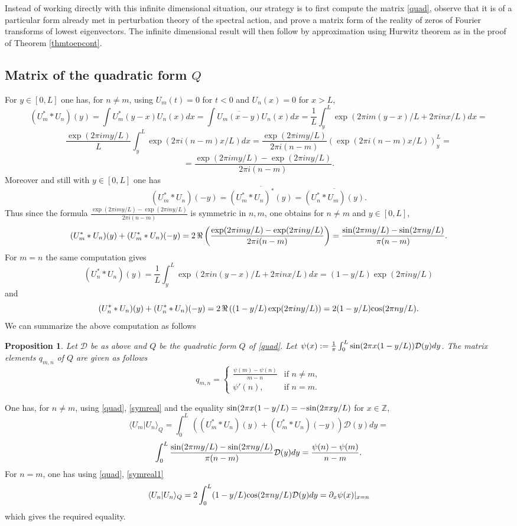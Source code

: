 \documentclass{amsart}
\newtheorem{prop}[thm]{Proposition}
\def\Z{{\mathbb Z}}
\def\cD{{\mathcal D}}
\def\sin{{{\rm sin}}}
\def\cos{{{\rm cos}}}
\def\Z{{\mathbb Z}}
\def\cD{{\mathcal D}}
\def\sin{{{\rm sin}}}
\def\cos{{{\rm cos}}}
\begin{document}
Instead of working directly with this infinite dimensional situation, our strategy is to   first compute the matrix \eqref{quad}, observe that it is of a particular form already met in perturbation theory of the spectral action, and prove a matrix form of the reality of zeros of Fourier transforms of lowest eigenvectors. The infinite dimensional result will then follow by approximation using Hurwitz theorem as in the proof of Theorem \ref{thmtoepcont}.
\subsection{Matrix of the quadratic form $Q$}
For $y\in [0,L]$ one has, for $n\neq m$, using $U_m(t)=0$ for $t<0$ and $U_n(x)=0$ for $x>L$,
$$
(U_m^**U_n)(y)=\int U_m^*(y-x)U_n(x)dx=\int \overline{ U_m(x-y)}U_n(x)dx=\frac 1L\int_y^L\exp(2\pi im(y-x)/L+2\pi inx/L)dx=
$$
$$
\frac{\exp(2\pi im y/L)}{L}\int_y^L\exp(2\pi i(n-m)x/L)dx=\frac{\exp(2\pi im y/L)}{2\pi i(n-m)}\left(\exp(2\pi i(n-m)x/L)\right)_y^L=$$ $$=\frac{\exp(2\pi im y/L)-\exp(2\pi in y/L)}{2\pi i(n-m)}.
$$
Moreover and still with $y\in [0,L]$ one has
$$
(U_m^**U_n)(-y)=\overline{(U_m^**U_n)^*(y)}=\overline{(U_n^**U_m)(y)}.
$$
Thus since the formula $\frac{\exp(2\pi im y/L)-\exp(2\pi in y/L)}{2\pi i(n-m)}$ is symmetric in $n,m$, one obtains for $n\neq m$ and $y\in [0,L]$,
\begin{equation}\label{symreal}
(U_m^**U_n)(y)+(U_m^**U_n)(-y)=2\,\Re\left(\frac{\exp(2\pi im y/L)-\exp(2\pi in y/L)}{2\pi i(n-m)}\right)=	\frac{\sin(2\pi m y/L)-\sin(2\pi n y/L)}{\pi (n-m)}.
\end{equation}
For $m=n$ the same computation gives 
$$
(U_n^**U_n)(y)=\frac 1L\int_y^L\exp(2\pi in(y-x)/L+2\pi inx/L)dx=(1-y/L)\exp(2\pi in y/L)
$$
and
\begin{equation}\label{symreal1}
(U_n^**U_n)(y)+(U_n^**U_n)(-y)=2\,\Re\left((1-y/L)\exp(2\pi in y/L)\right)=2(1-y/L)\cos(2\pi n y/L).\end{equation}
We can summarize the above computation as follows

\begin{prop}\label{matrixcomp} Let $\cD$ be as above and $Q$ be the quadratic form $Q$ of \eqref{quad}. Let $\psi(x):=\frac 1 \pi \int_0^L \sin(2\pi x(1- y/L))\cD(y)dy$. The matrix elements $q_{m,n}$ of $Q$ are given as follows 
\begin{equation}\label{matelem}
	q_{m,n}=\begin{cases} \frac{\psi(m)-\psi(n)}{m-n} & \text{if } n \neq m, \\
		\psi'(n), & \text{if } n = m.
	\end{cases}
\end{equation} 	
\end{prop}
\proof One has, for $n\neq m$,  using \eqref{quad}, \eqref{symreal} and the equality $\sin(2\pi x(1- y/L)=-\sin(2\pi x y/L)$ for $x\in \Z$,
$$
\langle U_m\vert U_n\rangle_Q=\int_0^L\, \left((U_m^**U_n)(y)+(U_m^**U_n)(-y)\right)\cD(y)dy=
$$
$$
\int_0^L \frac{\sin(2\pi m y/L)-\sin(2\pi n y/L)}{\pi (n-m)}\cD(y)dy= \frac{\psi(n)-\psi(m)}{n-m}.
$$
For $n=m$, one has  using \eqref{quad}, \eqref{symreal1}
$$
\langle U_n\vert U_n\rangle_Q=2\int_0^L (1-y/L)\cos(2\pi n y/L)\cD(y)dy=\partial_x\psi(x)\vert_{x=n}
$$
which gives the required equality.
\endproof
\end{document}
